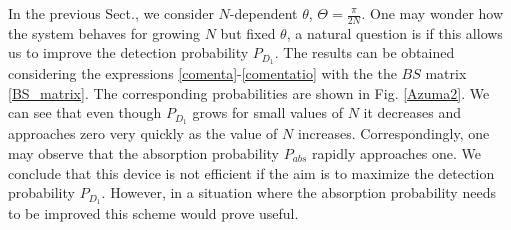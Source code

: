 \documentclass[12pt]{book}
\begin{document}
In the previous Sect., we consider $N$-dependent $\theta$, $\Theta = \frac{\pi}{2N}$. One may wonder how the system behaves for growing $N$ but fixed $\theta$, a natural question is if this allows us to improve the detection probability $P_{D_{1}}$. The results can be obtained considering the expressions \ref{comenta}-\ref{comentatio} with the the $BS$ matrix \ref{BS_matrix}. The corresponding probabilities are shown in Fig. \ref{Azuma2}. We can see that even though $P_{D_{1}}$ grows for small values of $N$ it decreases and approaches zero very quickly as the value of $N$ increases. Correspondingly, one may observe that the absorption probability $P_{abs}$ rapidly approaches one. We conclude that this device is not efficient if the aim is to maximize the detection probability $P_{D_{1}}$. However, in a situation where the absorption probability needs to be improved this scheme would prove useful.
\end{document}
